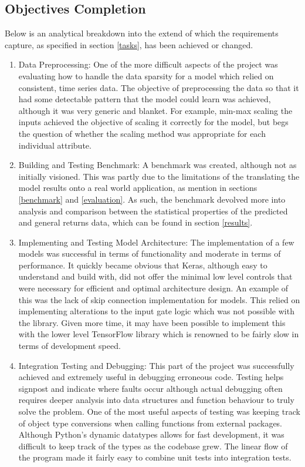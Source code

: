 \documentclass[10pt,onecolumn,letterpaper]{article}
\begin{document}
\subsection{Objectives Completion} \label{objectives_completed}

Below is an analytical breakdown into the extend of which the requirements capture, as specified in section \ref{tasks}, has been achieved or changed. 

\begin{enumerate}
	\item Data Preprocessing: One of the more difficult aspects of the project was evaluating how to handle the data sparsity for a model which relied on consistent, time series data. The objective of preprocessing the data so that it had some detectable pattern that the model could learn was achieved, although it was very generic and blanket. For example, min-max scaling the inputs achieved the objective of scaling it correctly for the model, but begs the question of whether the scaling method was appropriate for each individual attribute. 
	\item Building and Testing Benchmark: A benchmark was created, although not as initially visioned. This was partly due to the limitations of the translating the model results onto a real world application, as mention in sections \ref{benchmark} and \ref{evaluation}. As such, the benchmark devolved more into analysis and comparison between the statistical properties of the predicted and general returns data, which can be found in section \ref{results}.
	\item Implementing and Testing Model Architecture: The implementation of a few models was successful in terms of functionality and moderate in terms of performance. It quickly became obvious that Keras, although easy to understand and build with, did not offer the minimal low level controls that were necessary for efficient and optimal architecture design. An example of this was the lack of skip connection implementation for models. This relied on implementing alterations to the input gate logic which was not possible with the library. Given more time, it may have been possible to implement this with the lower level TensorFlow library which is renowned to be fairly slow in terms of development speed.
	\item Integration Testing and Debugging: This part of the project was successfully achieved and extremely useful in debugging erroneous code. Testing helps signpost and indicate where faults occur although actual debugging often requires deeper analysis into data structures and function behaviour to truly solve the problem. One of the most useful aspects of testing was keeping track of object type conversions when calling functions from external packages. Although Python's dynamic datatypes allows for fast development, it was difficult to keep track of the types as the codebase grew. The linear flow of the program made it fairly easy to combine unit tests into integration tests.

\end{enumerate}
\end{document}
